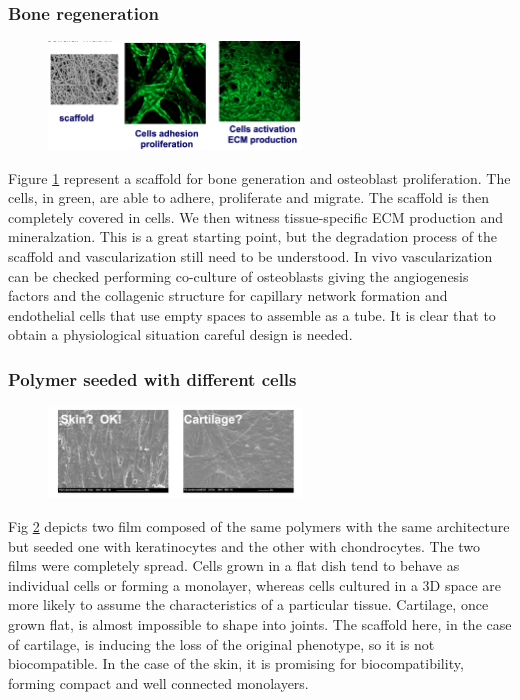        \subsubsection{Bone regeneration}

        \begin{figure}[h]
            \centering
            \includegraphics[width=0.6\textwidth]{3D.png}
            \caption{\label{fig:3D}}
        \end{figure}

        Figure \ref{fig:3D} represent a scaffold for bone generation and osteoblast proliferation.
        The cells, in green, are able to adhere, proliferate and migrate.
        The scaffold is then completely covered in cells.
        We then witness tissue-specific ECM production and mineralzation.
        This is a great starting point, but the degradation process of the scaffold and vascularization still need to be understood.
        In vivo vascularization can be checked performing co-culture of osteoblasts giving the angiogenesis factors and the collagenic structure for capillary network formation and endothelial cells that use empty spaces to assemble as a tube.
        It is clear that to obtain a physiological situation careful design is needed.

        \subsubsection{Polymer seeded with different cells}

        \begin{figure}[h]
            \centering
            \includegraphics[width=0.6\textwidth]{sk_car.jpg}
            \caption{\label{fig:sk_car}}
        \end{figure}

        Fig \ref{fig:sk_car} depicts two film composed of the same polymers with the same architecture but seeded one with keratinocytes and the other with chondrocytes.
        The two films were completely spread.
        Cells grown in a flat dish tend to behave as individual cells or forming a monolayer, whereas cells cultured in a 3D space are more likely to assume the characteristics of a particular tissue.
        Cartilage, once grown flat, is almost impossible to shape into joints.
        The scaffold here, in the case of cartilage, is inducing the loss of the original phenotype, so it is not biocompatible.
        In the case of the skin, it is promising for biocompatibility, forming compact and well connected monolayers.

